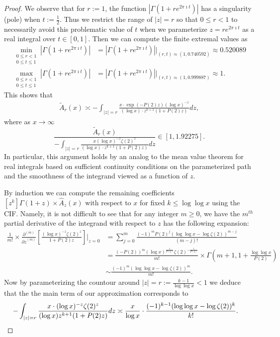 \documentclass[11pt,reqno,a4letter]{article}
\numberwithin{figure}{section}
\numberwithin{table}{section}
\theoremstyle{plain}
\numberwithin{theorem}{section}
\theoremstyle{definition}
\begin{document}
\begin{proof}
We observe that for $r := 1$, the function $|\Gamma(1+re^{2\pi\imath t})|$ has a 
singularity (pole) when $t := \frac{1}{2}$. Thus we restrict the range of $|z| = r$ 
so that $0 \leq r < 1$ to necessarily avoid this problematic value of $t$ when 
we parameterize $z = r e^{2\pi\imath t}$ as a real integral over $t \in [0, 1]$. 
Then we can compute the finite extremal values as 
\begin{align*} 
\min\limits_{\substack{0 \leq r < 1 \\ 0 \leq t \leq 1}} |\Gamma(1+re^{2\pi\imath t})| & = 
     |\Gamma(1+re^{2\pi\imath t})| \Biggr\rvert_{(r,t) \approx (1, 0.740592)} \approx 
     0.520089 \\ 
\max\limits_{\substack{0 \leq r < 1 \\ 0 \leq t \leq 1}} |\Gamma(1+re^{2\pi\imath t})| & = 
     |\Gamma(1+re^{2\pi\imath t})| \Biggr\rvert_{(r,t) \approx (1, 0.999887)} \approx 1. 
\end{align*} 
This shows that 
\begin{align} 
\label{eqn_WideTildeArx_CountourIntDef_v2} 
\widetilde{A}_r(x) \asymp 
     -\int_{|z|=r} \frac{x \cdot \exp(-P(2) z) (\log x)^{-z}}{(\log x) \cdot 
     z^{k+1} (1 + P(2) z)} dz, 
\end{align} 
where as $x \rightarrow \infty$ 
\[
\frac{\widetilde{A}_r(x)}{-\int_{|z|=r} \frac{x (\log x)^{-z} \zeta(2)^{z}}{(\log x) \cdot 
     z^{k+1} (1 + P(2) z)} dz} \in [1, 1.92275]. 
\] 
In particular, this argument holds by an analog to the mean value theorem for real integrals 
based on sufficient continuity conditions on the parameterized path and the 
smoothness of the integrand viewed as a function of $z$.  

By induction we can compute the remaining coefficients 
$[z^k] \Gamma(1+z) \times \widehat{A}_z(x)$ with respect to 
$x$ for fixed $k \leq \log\log x$ using the CIF. 
Namely, it is not difficult to see that for any integer $m \geq 0$, 
we have the $m^{th}$ partial derivative of the integrand with respect to $z$ 
has the following expansion: 
\begin{align*} 
\frac{1}{m!} \times \frac{\partial^{(m)}}{{\partial z}^{(m)}}\left[ 
     \frac{(\log x)^{-z} \zeta(2)^{z}}{1 + P(2) z}\right] \Biggr\rvert_{z=0} & = 
     \sum_{j=0}^{m} \frac{(-1)^{m} P(2)^{j} (\log\log x - \log\zeta(2))^{m-j}}{(m-j)!} \\ 
     & = 
     \frac{(-P(2))^{m} (\log x)^{\frac{1}{P(2)}} \zeta(2)^{-\frac{1}{P(2)}}}{m!} \times 
     \Gamma\left(m+1, 1 + \frac{\log\log x}{P(2)}\right) \\ 
     & \sim \frac{(-1)^m (\log\log x -\log\zeta(2))^{m}}{m!}. 
\end{align*} 
Now by parameterizing the countour around $|z| = r := \frac{k-1}{\log\log x} < 1$ we 
deduce that the the main term of our approximation corresponds to 
\begin{align*} 
-\int_{|z|=r} \frac{x \cdot (\log x)^{-z} \zeta(2)^{z}}{(\log x) z^{k+1} (1 + P(2) z)} dz & \asymp 
     \frac{x}{\log x} \cdot \frac{(-1)^{k-1} (\log\log x - \log\zeta(2))^{k}}{k!}. 
     \qedhere 
\end{align*} 
\end{proof} 
\end{document}
